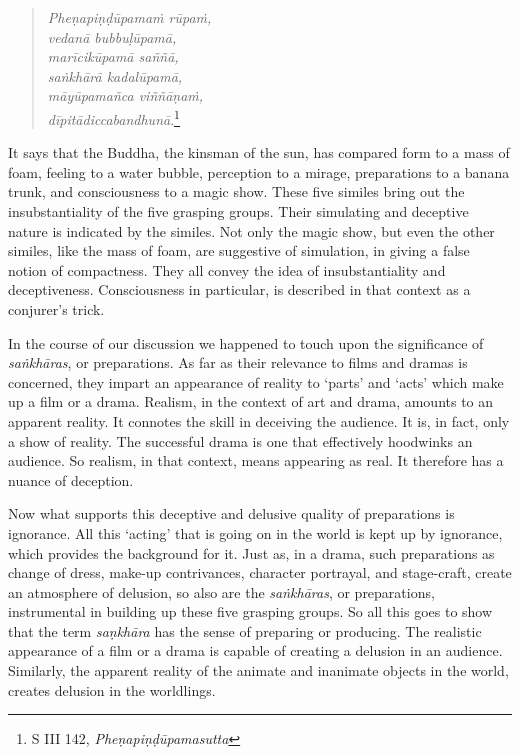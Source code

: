 \begin{quote}
\emph{Pheṇapiṇḍūpamaṁ rūpaṁ,}\\
\emph{vedanā bubbuḷūpamā,}\\
\emph{marīcikūpamā saññā,}\\
\emph{saṅkhārā kadalūpamā,}\\
\emph{māyūpamañca viññāṇaṁ,}\\
\emph{dīpitādiccabandhunā}.\footnote{S III 142, \emph{Pheṇapiṇḍūpamasutta}}
\end{quote}

It says that the Buddha, the kinsman of the sun, has compared form to a mass of foam, feeling to a water bubble, perception to a mirage, preparations to a banana trunk, and consciousness to a magic show. These five similes bring out the insubstantiality of the five grasping groups. Their simulating and deceptive nature is indicated by the similes. Not only the magic show, but even the other similes, like the mass of foam, are suggestive of simulation, in giving a false notion of compactness. They all convey the idea of insubstantiality and deceptiveness. Consciousness in particular, is described in that context as a conjurer's trick.

\clearpage

In the course of our discussion we happened to touch upon the significance of \emph{saṅkhāras}, or preparations. As far as their relevance to films and dramas is concerned, they impart an appearance of reality to `parts' and `acts' which make up a film or a drama. Realism, in the context of art and drama, amounts to an apparent reality. It connotes the skill in deceiving the audience. It is, in fact, only a show of reality. The successful drama is one that effectively hoodwinks an audience. So realism, in that context, means appearing as real. It therefore has a nuance of deception.

Now what supports this deceptive and delusive quality of preparations is ignorance. All this `acting' that is going on in the world is kept up by ignorance, which provides the background for it. Just as, in a drama, such preparations as change of dress, make-up contrivances, character portrayal, and stage-craft, create an atmosphere of delusion, so also are the \emph{saṅkhāras}, or preparations, instrumental in building up these five grasping groups. So all this goes to show that the term \emph{saṇkhāra} has the sense of preparing or producing. The realistic appearance of a film or a drama is capable of creating a delusion in an audience. Similarly, the apparent reality of the animate and inanimate objects in the world, creates delusion in the worldlings.

